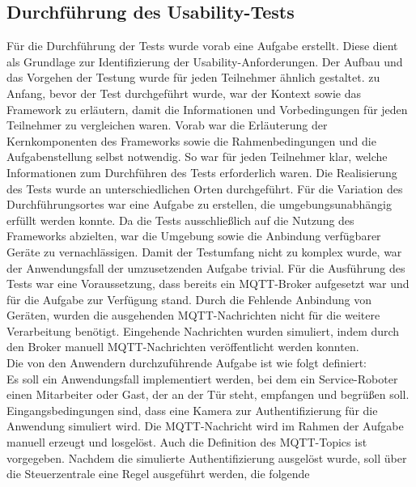     \subsection{Durchführung des Usability-Tests}
        Für die Durchführung der Tests wurde vorab eine Aufgabe erstellt. Diese 
        dient als Grundlage zur Identifizierung der Usability-Anforderungen. Der Aufbau und das Vorgehen der Testung wurde für jeden Teilnehmer 
        ähnlich gestaltet. zu Anfang, bevor der Test durchgeführt wurde, war der Kontext sowie das Framework zu erläutern, damit 
        die Informationen und Vorbedingungen für jeden Teilnehmer zu vergleichen waren. Vorab war die Erläuterung der 
        Kernkomponenten des Frameworks sowie die Rahmenbedingungen und die Aufgabenstellung selbst notwendig. So war für jeden Teilnehmer 
        klar, welche Informationen zum Durchführen des Tests erforderlich waren. Die Realisierung des Tests wurde 
        an unterschiedlichen Orten durchgeführt. Für die Variation des Durchführungsortes war eine Aufgabe zu erstellen, die umgebungsunabhängig 
        erfüllt werden konnte. Da die Tests ausschließlich auf die Nutzung des Frameworks abzielten, war die Umgebung sowie die 
        Anbindung verfügbarer Geräte zu vernachlässigen. Damit der Testumfang nicht zu komplex wurde, war der Anwendungsfall der 
        umzusetzenden Aufgabe trivial. Für die Ausführung des Tests war eine Voraussetzung, dass bereits ein \acs{MQTT}-Broker 
        aufgesetzt war und für die Aufgabe zur Verfügung stand. Durch die Fehlende Anbindung von Geräten, wurden die ausgehenden 
        \acs{MQTT}-Nachrichten nicht für die weitere Verarbeitung benötigt. Eingehende Nachrichten wurden simuliert, indem durch den Broker 
        manuell \acs{MQTT}-Nachrichten veröffentlicht werden konnten.
        \\
        Die von den Anwendern durchzuführende Aufgabe ist wie folgt definiert: 
        \\
        \linebreak
        Es soll ein Anwendungsfall implementiert werden, bei dem ein Service-Roboter einen Mitarbeiter oder Gast, der an der Tür steht, 
        empfangen und begrüßen soll. Eingangsbedingungen sind, dass eine Kamera zur Authentifizierung für die Anwendung simuliert wird. 
        Die \acs{MQTT}-Nachricht wird im Rahmen der Aufgabe manuell erzeugt und losgelöst. Auch die Definition des \acs{MQTT}-Topics ist vorgegeben. 
        Nachdem die simulierte Authentifizierung ausgelöst wurde, soll über die Steuerzentrale eine Regel ausgeführt werden, die folgende 
